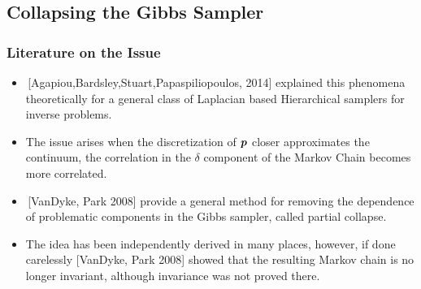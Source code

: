 \documentclass[]{beamer}
\newcommand{\bm}[1]{\mbox{\boldmath$#1$}}
\newcommand{\vect}[1]{\bm{#1}}
\begin{document}
\subsection{Collapsing the Gibbs Sampler}
\begin{frame}[t]
  \frametitle{Literature on the Issue}
  {\small
  \begin{itemize}
    \itemsep 1.2em
    \item \,[Agapiou,Bardsley,Stuart,Papaspiliopoulos, 2014] explained this phenomena theoretically for a general class of Laplacian based Hierarchical samplers for inverse problems.
    \item The issue arises when the discretization of \alert{$\vect p$} closer approximates the continuum, the correlation in the \alert{$\delta$} component of the Markov Chain becomes more correlated.
    \item \,[VanDyke, Park 2008] provide a general method for removing the dependence of problematic components in the Gibbs sampler, called \alert{partial collapse}.
    \item The idea has been independently derived in many places, however, if done carelessly [VanDyke, Park 2008] showed that the resulting Markov chain is no longer \alert{invariant}, although invariance was not proved there.
  \end{itemize}
  }
\end{frame}
\end{document}
